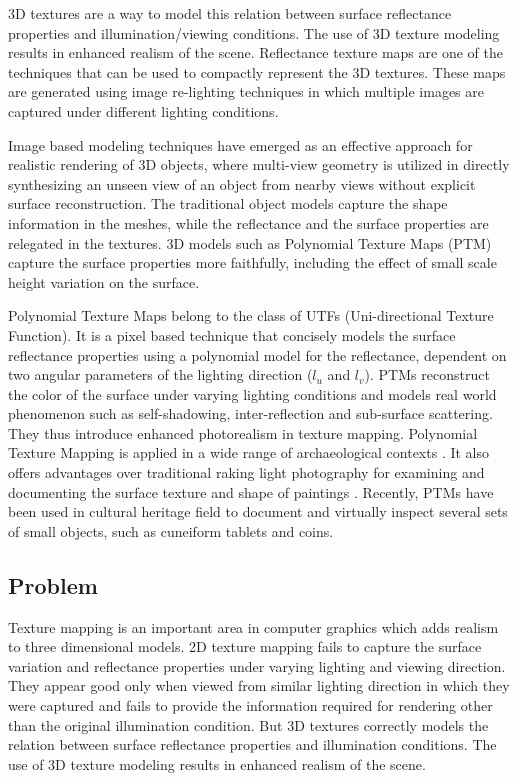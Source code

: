 
3D textures are a way to model this relation between surface reflectance
properties and illumination/viewing conditions.
The use of 3D texture modeling
results in enhanced realism of the scene. Reflectance texture maps are one of
the techniques that can be used to compactly represent the 3D textures. These
maps are generated using image re-lighting techniques \cite{C5,C4,C2} in which
multiple images are captured under different lighting conditions.

Image based modeling techniques \cite{C8,C6,C7} have emerged as
an effective approach for realistic rendering of 3D objects,
where multi-view geometry is utilized in directly synthesizing 
an unseen view of an object from nearby views without
explicit surface reconstruction. The traditional object models capture the shape information in the meshes,
while the reflectance and the surface properties are relegated in the textures. 3D models such as 
Polynomial Texture Maps (PTM) capture the 
surface properties more faithfully, including the effect of small scale height variation on the surface.

Polynomial Texture Maps \cite{C4} belong to the class of UTFs (Uni-directional Texture Function). It is a pixel
based technique that concisely models the surface reflectance properties using a
polynomial model for the reflectance, dependent on two angular parameters of the
lighting direction ($l_u$ and $l_v$). PTMs reconstruct the color of the surface under varying
lighting conditions and models real world phenomenon such as
self-shadowing, inter-reflection and sub-surface scattering. They thus introduce
enhanced photorealism in texture mapping.
Polynomial Texture Mapping is applied in a wide
range of archaeological contexts \cite{C14}. 
It also offers advantages over traditional raking
light photography for examining and
documenting the surface texture and
shape of paintings \cite{C13}.
Recently, PTMs have been used in cultural heritage field to document and virtually inspect 
several sets of small objects, such as cuneiform tablets and coins.

\subsection{Problem}
Texture mapping is an important area in computer graphics which adds realism to three dimensional 
models. 2D texture mapping fails to capture the surface variation and reflectance properties under
varying lighting and viewing direction. They appear good only when viewed from similar lighting
direction in which they were captured and fails to provide the information required for rendering other than the original
illumination condition. But 3D textures correctly models the relation between surface reflectance
properties and illumination conditions. The use of 3D texture modeling
results in enhanced realism of the scene.

